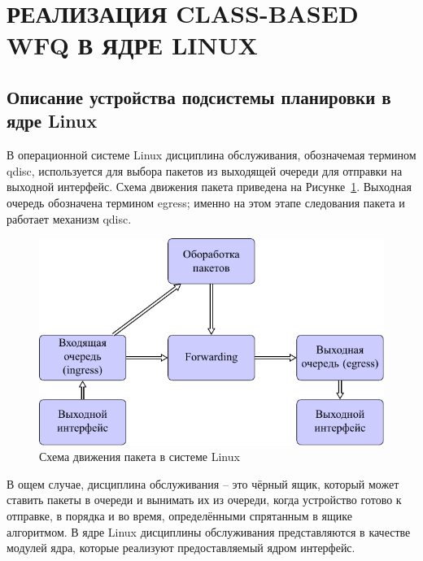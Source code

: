 \section{РЕАЛИЗАЦИЯ CLASS-BASED WFQ В ЯДРЕ LINUX}

	\subsection{Описание устройства подсистемы планировки в ядре Linux}

	В операционной системе Linux
	дисциплина обслуживания, обозначемая термином qdisc, используется
	для выбора пакетов из выходящей очереди для отправки на выходной интерфейс.
	Схема движения пакета приведена на Рисунке~\ref{pic:flow}. Выходная очередь
	обозначена термином egress; именно на этом этапе следования пакета
	и работает механизм qdisc.\cite{lartc}

    \begin{figure}[ht!]
        \center
        \includegraphics{pdfimages/qdisc.pdf}
        \caption{Схема движения пакета в системе Linux\cite{tcpip}}
		\label{pic:flow}
    \end{figure}


	В ощем случае, дисциплина обслуживания -- это чёрный ящик, который может
	ставить пакеты в очереди и вынимать их из очереди, когда устройство
	готово к отправке, в порядка и во время, определёнными спрятанным в ящике
	алгоритмом. В ядре Linux дисциплины обслуживания представляются в качестве
	модулей ядра, которые реализуют предоставляемый ядром интерфейс.

